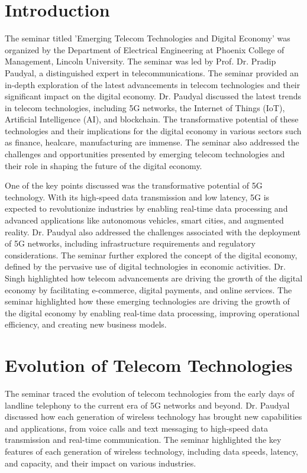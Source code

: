 \documentclass[conference]{IEEEtran}
\begin{document}
\section{Introduction}
The seminar titled 'Emerging Telecom Technologies and Digital Economy' was organized by the Department of Electrical Engineering at Phoenix College of Management, Lincoln University. The seminar was led by Prof. Dr. Pradip Paudyal, a distinguished expert in telecommunications. The seminar provided an in-depth exploration of the latest advancements in telecom technologies and their significant impact on the digital economy.
Dr. Paudyal discussed the latest trends in telecom technologies, including 5G networks, the Internet of Things (IoT), Artificial Intelligence (AI), and blockchain. The transformative potential of these technologies and their implications for the digital economy in various sectors such as finance, healcare, manufacturing are immense. \cite{Singanamalla2022} The seminar also addressed the challenges and opportunities presented by emerging telecom technologies and their role in shaping the future of the digital economy. \par One of the key points discussed was the transformative potential of 5G technology. With its high-speed data transmission and low latency, 5G is expected to revolutionize industries by enabling real-time data processing and advanced applications like autonomous vehicles, smart cities, and augmented reality. Dr. Paudyal also addressed the challenges associated with the deployment of 5G networks, including infrastructure requirements and regulatory considerations. 
The seminar further explored the concept of the digital economy, defined by the pervasive use of digital technologies in economic activities. Dr. Singh highlighted how telecom advancements are driving the growth of the digital economy by facilitating e-commerce, digital payments, and online services. The seminar highlighted how these emerging technologies are driving the growth of the digital economy by enabling real-time data processing, improving operational efficiency, and creating new business models.

\section{Evolution of Telecom Technologies}
The seminar traced the evolution of telecom technologies from the early days of landline telephony to the current era of 5G networks and beyond. Dr. Paudyal discussed how each generation of wireless technology has brought new capabilities and applications, from voice calls and text messaging to high-speed data transmission and real-time communication. The seminar highlighted the key features of each generation of wireless technology, including data speeds, latency, and capacity, and their impact on various industries.
\end{document}
